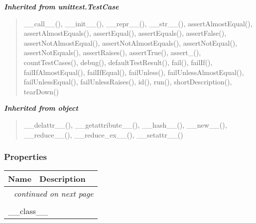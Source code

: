 \large{\textbf{\textit{Inherited from unittest.TestCase}}}

\begin{quote}
\_\_call\_\_(), \_\_init\_\_(), \_\_repr\_\_(), \_\_str\_\_(), assertAlmostEqual(), assertAlmostEquals(), assertEqual(), assertEquals(), assertFalse(), assertNotAlmostEqual(), assertNotAlmostEquals(), assertNotEqual(), assertNotEquals(), assertRaises(), assertTrue(), assert\_(), countTestCases(), debug(), defaultTestResult(), fail(), failIf(), failIfAlmostEqual(), failIfEqual(), failUnless(), failUnlessAlmostEqual(), failUnlessEqual(), failUnlessRaises(), id(), run(), shortDescription(), tearDown()
\end{quote}

\large{\textbf{\textit{Inherited from object}}}

\begin{quote}
\_\_delattr\_\_(), \_\_getattribute\_\_(), \_\_hash\_\_(), \_\_new\_\_(), \_\_reduce\_\_(), \_\_reduce\_ex\_\_(), \_\_setattr\_\_()
\end{quote}


  \subsubsection{Properties}

    \vspace{-1cm}
\hspace{\varindent}\begin{longtable}{|p{\varnamewidth}|p{\vardescrwidth}|l}
\cline{1-2}
\cline{1-2} \centering \textbf{Name} & \centering \textbf{Description}& \\
\cline{1-2}
\endhead\cline{1-2}\multicolumn{3}{r}{\small\textit{continued on next page}}\\\endfoot\cline{1-2}
\endlastfoot\multicolumn{2}{|l|}{\textit{Inherited from object}}\\
\multicolumn{2}{|p{\varwidth}|}{\raggedright \_\_class\_\_}\\
\cline{1-2}
\end{longtable}



